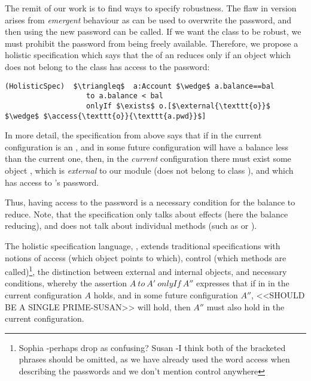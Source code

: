  
 The remit of our work is to find ways to specify robustness. 
 The flaw in version {} arises from \emph{emergent} behaviour as  
 can be used to overwrite the
 password, and then using the new password   can be called.
 If we want the  class to be robust, we must prohibit the password from being freely available.
 Therefore, we propose a holistic specification which says that
 the  of an  reduces only if an object which does not belong to the
 class  has access to the password:
 
 \begin{lstlisting}[language = Chainmail, mathescape=true, frame=lines]
(HolisticSpec)  $\triangleq$  a:Account $\wedge$ a.balance==bal
                   to a.balance < bal
                   onlyIf $\exists$ o.[$\external{\texttt{o}}$ $\wedge$ $\access{\texttt{o}}{\texttt{a.pwd}}$]
\end{lstlisting}
 
 
 In more detail, the specification from above says that if in the current
 configuration  is an ,
 and in some future configuration  will have a balance less than the current one, then, in the \emph{current} configuration
 there must exist some object , which is \emph{external} to our module (does not belong to class
 ), and which has access to 's password.
 
 
 Thus, having access to the password is a necessary condition for the balance to reduce.
 Note, that the specification only talks about effects (here the balance reducing), and does not
 talk about individual methods (such as  or ).
 

 The holistic specification language, \Chainmail, extends traditional specifications with
notions of access (which object points to which), control (which methods are called)\footnote{Sophia -perhaps drop as confusing? Susan -I think both of the bracketed phrases should be omitted, as we have already used the word access when describing the passwords and we don't mention control anywhere}, 
 the distinction between external and internal objects, and necessary conditions, 
 whereby the assertion $A~to~A'~onlyIf~A''$ expresses that if in in the current configuration
 $A$ holds, and in some future configuration $A''$, <<SHOULD BE A SINGLE PRIME-SUSAN>> will hold, then $A''$ must also hold in the 
 current configuration.  
 
